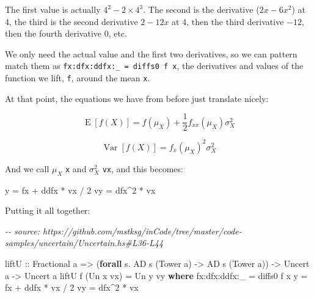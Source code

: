 \documentclass[]{article}
\newenvironment{Shaded}{}{}
\newcommand{\CommentTok}[1]{\textcolor[rgb]{0.38,0.63,0.69}{\textit{#1}}}
\newcommand{\DataTypeTok}[1]{\textcolor[rgb]{0.56,0.13,0.00}{#1}}
\newcommand{\DecValTok}[1]{\textcolor[rgb]{0.25,0.63,0.44}{#1}}
\newcommand{\KeywordTok}[1]{\textcolor[rgb]{0.00,0.44,0.13}{\textbf{#1}}}
\newcommand{\NormalTok}[1]{#1}
\newcommand{\OperatorTok}[1]{\textcolor[rgb]{0.40,0.40,0.40}{#1}}
\newcommand{\OtherTok}[1]{\textcolor[rgb]{0.00,0.44,0.13}{#1}}
\begin{document}
The first value is actually \(4^2 - 2 \times 4^3\). The second is the derivative
(\(2 x - 6x^2\)) at 4, the third is the second derivative \(2 - 12 x\) at 4,
then the third derivative \(-12\), then the fourth derivative \(0\), etc.

We only need the actual value and the first two derivatives, so we can pattern
match them as \texttt{fx:dfx:ddfx:\_\ =\ diffs0\ f\ x}, the derivatives and
values of the function we lift, \texttt{f}, around the mean \texttt{x}.

At that point, the equations we have from before just translate nicely:

\[
\operatorname{E}[f(X)] = f(\mu_X) + \frac{1}{2} f_{xx}(\mu_X) \sigma_X^2
\]

\[
\operatorname{Var}[f(X)] = f_x(\mu_X)^2 \sigma_X^2
\]

And we call \(\mu_X\) \texttt{x} and \(\sigma_X^2\) \texttt{vx}, and this
becomes:

\begin{Shaded}
\begin{Highlighting}[]
\NormalTok{y  }\OtherTok{=}\NormalTok{ fx }\OperatorTok{+}\NormalTok{ ddfx }\OperatorTok{*}\NormalTok{ vx }\OperatorTok{/} \DecValTok{2}
\NormalTok{vy }\OtherTok{=}\NormalTok{ dfx}\OperatorTok{\^{}}\DecValTok{2} \OperatorTok{*}\NormalTok{ vx}
\end{Highlighting}
\end{Shaded}

Putting it all together:

\begin{Shaded}
\begin{Highlighting}[]
\CommentTok{{-}{-} source: https://github.com/mstksg/inCode/tree/master/code{-}samples/uncertain/Uncertain.hs\#L36{-}L44}

\OtherTok{liftU ::} \DataTypeTok{Fractional}\NormalTok{ a}
      \OtherTok{=\textgreater{}}\NormalTok{ (}\KeywordTok{forall}\NormalTok{ s}\OperatorTok{.} \DataTypeTok{AD}\NormalTok{ s (}\DataTypeTok{Tower}\NormalTok{ a) }\OtherTok{{-}\textgreater{}} \DataTypeTok{AD}\NormalTok{ s (}\DataTypeTok{Tower}\NormalTok{ a))}
      \OtherTok{{-}\textgreater{}} \DataTypeTok{Uncert}\NormalTok{ a}
      \OtherTok{{-}\textgreater{}} \DataTypeTok{Uncert}\NormalTok{ a}
\NormalTok{liftU f (}\DataTypeTok{Un}\NormalTok{ x vx) }\OtherTok{=} \DataTypeTok{Un}\NormalTok{ y vy}
  \KeywordTok{where}
\NormalTok{    fx}\OperatorTok{:}\NormalTok{dfx}\OperatorTok{:}\NormalTok{ddfx}\OperatorTok{:}\NormalTok{\_ }\OtherTok{=}\NormalTok{ diffs0 f x}
\NormalTok{    y             }\OtherTok{=}\NormalTok{ fx }\OperatorTok{+}\NormalTok{ ddfx }\OperatorTok{*}\NormalTok{ vx }\OperatorTok{/} \DecValTok{2}
\NormalTok{    vy            }\OtherTok{=}\NormalTok{ dfx}\OperatorTok{\^{}}\DecValTok{2} \OperatorTok{*}\NormalTok{ vx}
\end{Highlighting}
\end{Shaded}
\end{document}
